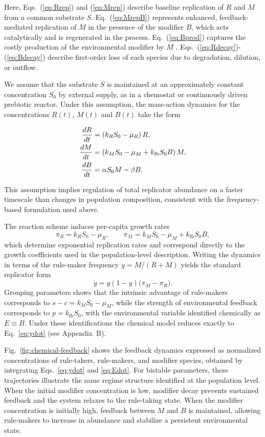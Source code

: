 Here, Eqs.~(\ref{eq:Rrep}) and (\ref{eq:Mrep}) describe baseline replication of $R$ and $M$ from a common substrate $S$. Eq.~(\ref{eq:MrepB}) represents enhanced, feedback-mediated replication of $M$ in the presence of the modifier $B$, which acts catalytically and is regenerated in the process. Eq.~(\ref{eq:Bprod}) captures the costly production of the environmental modifier by $M$ . Eqs.~(\ref{eq:Rdecay})-(\ref{eq:Bdecay}) describe first-order loss of each species due to degradation, dilution, or outflow.

We assume that the substrate $S$ is maintained at an approximately constant concentration $S_0$ by external supply, as in a chemostat or continuously driven prebiotic reactor. Under this assumption, the mass-action dynamics for the concentrations $R(t)$, $M(t)$ and $B(t)$ take the form

\begin{align}
\frac{dR}{dt} &= \left(k_R S_0 - \mu_R\right) R, \label{eq:Rdot} \\
\frac{dM}{dt} &= \left(k_M S_0 - \mu_M + k_{\mathrm{fb}} S_0 B\right) M, \label{eq:Mdot} \\
\frac{dB}{dt} &= \alpha S_0 M - \beta B. \label{eq:Bdot}
\end{align}

This assumption implies regulation of total replicator abundance on a faster timescale than changes
in population composition, consistent with the frequency-based formulation used above.

The reaction scheme induces per-capita growth rates
\[
\pi_R = k_R S_0 - \mu_R,
\qquad
\pi_M = k_M S_0 - \mu_M + k_{\mathrm{fb}} S_0 B,
\]
which determine exponential replication rates and correspond directly to the growth coefficients
used in the population-level description. Writing the dynamics in terms of the
rule-maker frequency $y = M/(R+M)$ yields the standard replicator form
\[
\dot y = y(1-y)\bigl(\pi_M - \pi_R\bigr).
\]
Grouping parameters shows that the intrinsic advantage of rule-makers corresponds to 
$s-c = k_M S_0 - \mu_M$, while the strength of environmental feedback corresponds to 
$p = k_{\mathrm{fb}} S_0$, with the environmental variable identified chemically as $E \equiv B$.
Under these identifications the chemical model reduces exactly to Eq.~\eqref{eq:ydot} (see Appendix~B).

Fig.~\ref{fig:chemical-feedback} shows the feedback dynamics expressed as normalized concentrations
of rule-takers, rule-makers, and modifier species, obtained by integrating
Eqs.~\eqref{eq:ydot} and \eqref{eq:Edot}. For bistable parameters, these trajectories illustrate the
same regime structure identified at the population level. When the initial modifier concentration is
low, modifier decay prevents sustained feedback and the system relaxes to the rule-taking state.
When the modifier concentration is initially high, feedback between $M$ and $B$ is maintained,
allowing rule-makers to increase in abundance and stabilize a persistent environmental state.

